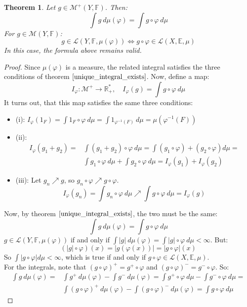 \documentclass[12pt, a4paper]{article}
\newtheorem{theorem}{Theorem}[section]
\numberwithin{equation}{section}
\begin{document}
\begin{theorem}
Let $g\in\mathcal{M}^+(Y,\mathbb{F})$. Then:
\begin{equation}
\int g\ d\mu(\varphi)=\int g\circ\varphi\ d\mu
\end{equation}
For $g\in\mathcal{M}(Y,\mathbb{F})$:
\begin{equation}
g\in\mathcal{L}(Y,\mathbb{F},\mu(\varphi))\Leftrightarrow g\circ\varphi\in\mathcal{L}(X,\mathbb{E},\mu)
\end{equation}
In this case, the formula above remains valid.
\end{theorem}
\begin{proof}
Since $\mu(\varphi)$ is a measure, the related integral satisfies the three conditions of theorem $\ref{unique_integral_exists}$. Now, define a map:
\begin{equation}
I_\varphi: \mathcal{M}^+\rightarrow\mathbb{R}^*_+,\quad I_\varphi(g)=\int g\circ\varphi\ d\mu
\end{equation}
It turns out, that this map satisfies the same three conditions:
\begin{itemize}
\item (i): $I_\varphi(1_F)=\int 1_F\circ\varphi\ d\mu=\int 1_{\varphi^{-1}(F)}\ d\mu=\mu(\varphi^{-1}(F))$
\item (ii):
\begin{align*}
I_\varphi(g_1+g_2)=&\int (g_1+g_2)\circ\varphi\ d\mu=\int (g_1\circ\varphi)+(g_2\circ\varphi)d\mu=\\
&\int g_1\circ\varphi\ d\mu+\int g_2\circ\varphi\ d\mu=I_\varphi(g_1)+I_\varphi(g_2)
\end{align*}
\item (iii): Let $g_n\nearrow g$, so $g_n\circ\varphi\nearrow g\circ\varphi$.
\begin{equation}
I_\varphi(g_n)=\int g_n\circ\varphi\ d\mu\nearrow\int g\circ\varphi\ d\mu=I_\varphi(g)
\end{equation}
\end{itemize}
Now, by theorem $\ref{unique_integral_exists}$, the two must be the same:
\begin{equation}
\int g\ d\mu(\varphi)=\int g\circ\varphi\ d\mu
\end{equation}
$g\in\mathcal{L}(Y,\mathbb{F},\mu(\varphi))$ if and only if $\int|g|\ d\mu(\varphi)=\int|g|\circ\varphi\ d\mu<\infty$. But:
\begin{equation}
(|g|\circ\varphi)(x)=|g(\varphi(x))|=|g\circ\varphi|(x)
\end{equation}
So $\int|g\circ\varphi|d\mu<\infty$, which is true if and only if $g\circ\varphi\in\mathcal{L}(X,\mathbb{E},\mu)$.\\
For the integrals, note that $(g\circ\varphi)^+=g^+\circ\varphi$ and $(g\circ\varphi)^-=g^-\circ\varphi$. So:
\begin{align*}
\int g\ d\mu(\varphi)=&\int g^+\ d\mu(\varphi)-\int g^-\ d\mu(\varphi)=\int g^+\circ\varphi\ d\mu-\int g^-\circ\varphi\ d\mu=\\
&\int (g\circ\varphi)^+\ d\mu(\varphi)-\int (g\circ\varphi)^-\ d\mu(\varphi)=\int g\circ\varphi\ d\mu
\end{align*}
\end{proof}
\end{document}
